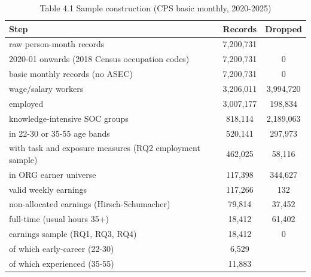 \begin{table}[htbp]\centering
\caption{Table 4.1 Sample construction (CPS basic monthly, 2020-2025)}
\begin{tabular}{lcc}
\toprule
Step & Records & Dropped \\
\midrule
raw person-month records & 7,200,731 &  \\
2020-01 onwards (2018 Census occupation codes) & 7,200,731 & 0 \\
basic monthly records (no ASEC) & 7,200,731 & 0 \\
wage/salary workers & 3,206,011 & 3,994,720 \\
employed & 3,007,177 & 198,834 \\
knowledge-intensive SOC groups & 818,114 & 2,189,063 \\
in 22-30 or 35-55 age bands & 520,141 & 297,973 \\
with task and exposure measures (RQ2 employment sample) & 462,025 & 58,116 \\
in ORG earner universe & 117,398 & 344,627 \\
valid weekly earnings & 117,266 & 132 \\
non-allocated earnings (Hirsch-Schumacher) & 79,814 & 37,452 \\
full-time (usual hours 35+) & 18,412 & 61,402 \\
earnings sample (RQ1, RQ3, RQ4) & 18,412 & 0 \\
  of which early-career (22-30) & 6,529 &  \\
  of which experienced (35-55) & 11,883 &  \\
\bottomrule
\end{tabular}
\par\vspace{2pt}{\footnotesize Counts of person-month records from the step 05 sample log (an ORG respondent can appear twice, a basic-monthly respondent up to eight times).}
\end{table}
